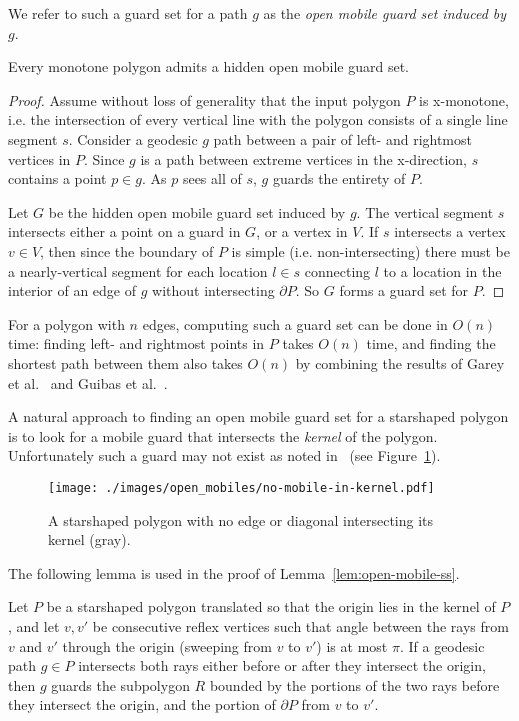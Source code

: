 \documentclass{cccg12}
\begin{document}
We refer to such a guard set for a path $g$ as the \emph{open mobile guard set induced by $g$}.

\begin{lemma}
\label{lem:open-mobile-monotone}
Every monotone polygon admits a hidden open mobile guard set.
\end{lemma}

\begin{proof}
Assume without loss of generality that the input polygon $P$ is x-monotone, i.e. the intersection of every vertical line with the polygon consists of a single line segment $s$.
Consider a geodesic $g$ path between a pair of left- and rightmost vertices in $P$.
Since $g$ is a path between extreme vertices in the x-direction, $s$ contains a point $p \in g$.
As $p$ sees all of $s$, $g$ guards the entirety of $P$.

Let $G$ be the hidden open mobile guard set induced by $g$.
The vertical segment $s$ intersects either a point on a guard in $G$, or a vertex in $V$.
If $s$ intersects a vertex $v \in V$, then since the boundary of $P$ is simple (i.e. non-intersecting) there must be a nearly-vertical segment for each location $l \in s$ connecting $l$ to a location in the interior of an edge of $g$ without intersecting $\partial P$.
So $G$ forms a guard set for $P$.
\end{proof}

For a polygon with $n$ edges, computing such a guard set can be done in $O(n)$ time: finding left- and rightmost points in $P$ takes $O(n)$ time, and finding the shortest path between them also takes $O(n)$ by combining the results of Garey et al.~\cite{Garey-1978} and Guibas et al.~\cite{Guibas-1987}.

A natural approach to finding an open mobile guard set for a starshaped polygon is to look for a mobile guard that intersects the \emph{kernel} of the polygon.
Unfortunately such a guard may not exist as noted in~\cite{ORourke-1987} (see Figure~\ref{fig:no-mobile-in-kernel}). 

\begin{figure}[ht]
\centering
\texttt{[image: ./images/open\_mobiles/no-mobile-in-kernel.pdf]}
\caption{A starshaped polygon with no edge or diagonal intersecting its kernel (gray).}
\label{fig:no-mobile-in-kernel}
\end{figure}

The following lemma is used in the proof of Lemma~\ref{lem:open-mobile-ss}. 

\begin{lemma}
\label{lem:a-mobile-sees-all}
Let $P$ be a starshaped polygon translated so that the origin lies in the kernel of $P$, and let $v, v'$ be consecutive reflex vertices such that angle between the rays from $v$ and $v'$ through the origin (sweeping from $v$ to $v'$) is at most $\pi$.
If a geodesic path $g \in P$ intersects both rays either before or after they intersect the origin, then $g$ guards the subpolygon $R$ bounded by the portions of the two rays before they intersect the origin, and the portion of $\partial P$ from $v$ to $v'$.
\end{lemma}
\end{document}
